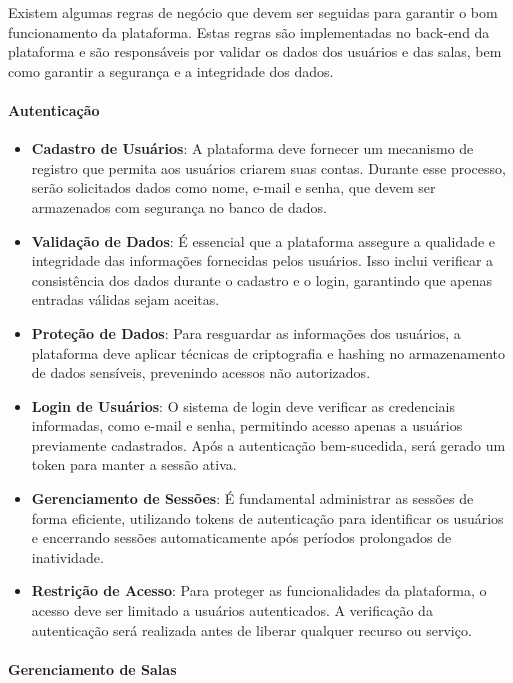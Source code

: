 Existem algumas regras de negócio que devem ser seguidas para garantir o bom funcionamento da plataforma. Estas regras são implementadas no back-end da plataforma e são responsáveis por validar os dados dos usuários e das salas, bem como garantir a segurança e a integridade dos dados.

\paragraph{Autenticação}

\begin{itemize}
    \item \textbf{Cadastro de Usuários}: A plataforma deve fornecer um mecanismo de registro que permita aos usuários criarem suas contas. Durante esse processo, serão solicitados dados como nome, e-mail e senha, que devem ser armazenados com segurança no banco de dados.
    \item \textbf{Validação de Dados}: É essencial que a plataforma assegure a qualidade e integridade das informações fornecidas pelos usuários. Isso inclui verificar a consistência dos dados durante o cadastro e o login, garantindo que apenas entradas válidas sejam aceitas.
    \item \textbf{Proteção de Dados}: Para resguardar as informações dos usuários, a plataforma deve aplicar técnicas de criptografia e hashing no armazenamento de dados sensíveis, prevenindo acessos não autorizados.
    \item \textbf{Login de Usuários}: O sistema de login deve verificar as credenciais informadas, como e-mail e senha, permitindo acesso apenas a usuários previamente cadastrados. Após a autenticação bem-sucedida, será gerado um token para manter a sessão ativa.
    \item \textbf{Gerenciamento de Sessões}: É fundamental administrar as sessões de forma eficiente, utilizando tokens de autenticação para identificar os usuários e encerrando sessões automaticamente após períodos prolongados de inatividade.
    \item \textbf{Restrição de Acesso}: Para proteger as funcionalidades da plataforma, o acesso deve ser limitado a usuários autenticados. A verificação da autenticação será realizada antes de liberar qualquer recurso ou serviço.
\end{itemize}

\paragraph{Gerenciamento de Salas}

